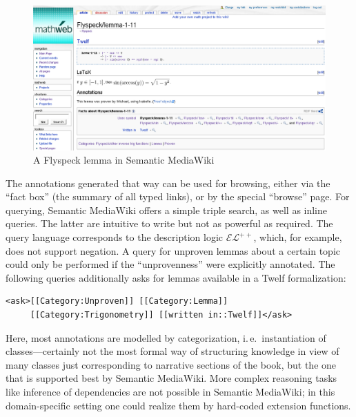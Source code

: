\begin{figure}
  \centering
  \includegraphics[width=\textwidth]{images/smw-lemma}
  \caption[A Flyspeck lemma in Semantic MediaWiki]{A Flyspeck lemma in Semantic
    MediaWiki\protect\footnotemark}
  \label{fig:smw-lemma}
\end{figure}
\addtocounter{footnote}{-1}

The annotations generated that way can be used for browsing, either via the
``fact box'' (the summary of all typed links), or by the special ``browse''
page.  For querying, Semantic MediaWiki offers a simple triple search, as well
as inline queries.  The latter are intuitive to write but not as powerful as
required.  The query language corresponds to the description logic
$\mathcal{EL}^{++}$\cite{KrSchVr:semwiki-reasoning07}, which, for example, does
not support negation.  A query for unproven lemmas about a certain topic could
only be performed if the ``unprovenness'' were explicitly annotated.  The
following queries additionally asks for lemmas available in a Twelf formalization:

\begin{lstlisting}
<ask>[[Category:Unproven]] [[Category:Lemma]]
     [[Category:Trigonometry]] [[written in::Twelf]]</ask>
\end{lstlisting}

Here, most annotations are modelled by categorization, i.\,e.\ instantiation of
classes---certainly not the most formal way of structuring knowledge in view of
many classes just corresponding to narrative sections of the book, but the one
that is supported best by Semantic MediaWiki.  More complex reasoning tasks like
inference of dependencies are not possible in Semantic MediaWiki; in this
domain-specific setting one could realize them by hard-coded extension
functions.

